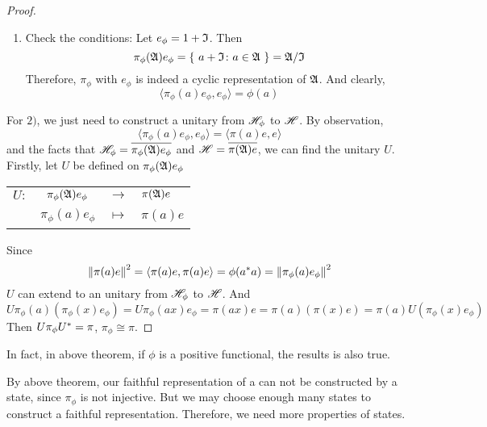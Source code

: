 \documentclass[a4paper,11pt]{report}
\begin{document}
\begin{proof}
\begin{enumerate}[label=\arabic*)]
		\item Check the conditions: Let $e_{\phi} = 1+\mathfrak{I}$. Then
		\begin{equation*}
			\pi_{\phi}(\mathfrak{A})e_{\phi} = \{~a+\mathfrak{I} \colon a \in \mathfrak{A}~\} = \mathfrak{A} / \mathfrak{I}
		\end{equation*}
		Therefore, $\pi_{\phi}$ with $e_{\phi}$ is indeed a cyclic representation of $\mathfrak{A}$. And clearly,
		\begin{equation*}
			\langle \pi_{\phi}(a)e_{\phi}, e_{\phi} \rangle = \phi(a)
		\end{equation*}
	\end{enumerate}
	For $2)$, we just need to construct a unitary from $\mathscr{H}_{\phi}$ to $\mathscr{H}$. By observation, 
	\begin{equation*}
		\langle \pi_{\phi}(a)e_{\phi}, e_{\phi} \rangle =\langle \pi(a)e, e \rangle
	\end{equation*}
	and the facts that $\mathscr{H}_{\phi}=\overline{\pi_{\phi}(\mathfrak{A})e_{\phi}}$ and $\mathscr{H}=\overline{\pi(\mathfrak{A})e}$, we can find the unitary $U$. Firstly, let $U$ be defined on $\pi_{\phi}(\mathfrak{A})e_{\phi}$ 
	\begin{center}
		\begin{tabular}{l c c l}
			$U \colon$ & $\pi_{\phi}(\mathfrak{A})e_{\phi}$ & $\longrightarrow$ & $\pi(\mathfrak{A})e$ \\
			~ & $\pi_{\phi}(a)e_{\phi}$ & $\longmapsto$ & $\pi(a)e$
		\end{tabular}
	\end{center}
	Since
	\begin{equation*}
		\left\lVert\pi(a)e\right\lVert^2 = \langle \pi(a)e, \pi(a)e \rangle = \phi(a^{*}a) = \left\lVert\pi_{\phi}(a)e_{\phi}\right\lVert^2
	\end{equation*}
	$U$ can extend to an unitary from $\mathscr{H}_{\phi}$ to $\mathscr{H}$. And
	\begin{equation*}
		U\pi_{\phi}(a)(\pi_{\phi}(x)e_{\phi}) = U\pi_{\phi}(ax)e_{\phi}=\pi(ax)e = \pi(a)(\pi(x)e) = \pi(a)U(\pi_{\phi}(x)e_{\phi})
	\end{equation*}
	Then $U\pi_{\phi}U^{*} = \pi$, $\pi_{\phi} \cong \pi$.
\end{proof}
\begin{rem}
	In fact, in above theorem, if $\phi$ is a positive functional, the results is also true.
\end{rem}

By above theorem, our faithful representation of a \Cs can not be constructed by a state, since $\pi_{\phi}$ is not injective. But we may choose enough many states to construct a faithful representation. Therefore, we need more properties of states.
\end{document}
